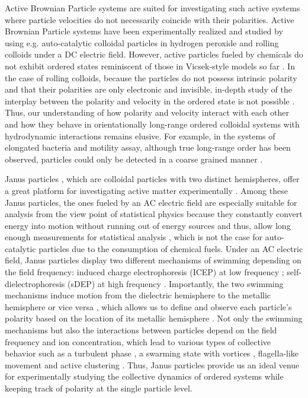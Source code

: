 \documentclass[%
 reprint,
 amsmath,amssymb,
 aps,
 floatfix
]{revtex4-2}
\begin{document}
Active Brownian Particle systems are suited for investigating such active systems where particle velocities do not necessarily coincide with their polarities.
Active Brownian Particle systems have been experimentally realized and studied by using e.g. auto-catalytic colloidal particles in hydrogen peroxide and rolling colloids under a DC electric field. 
However, active particles fueled by chemicals do not exhibit ordered states reminiscent of those in Vicsek-style models so far \cite{theurkauff2012,palacci2013,ginot2018}. 
In the case of rolling colloids, because the particles do not possess intrinsic polarity and that their polarities are only electronic and invisible, in-depth study of the interplay between the polarity and velocity in the ordered state is not possible \cite{bartolo2018}.
Thus, our understanding of how polarity and velocity interact with each other and how they behave in orientationally long-range ordered colloidal systems with hydrodynamic interactions remains elusive.
For example, in the systems of elongated bacteria and motility assay, although true long-range order has been observed, particles could only be detected in a coarse grained manner \cite{nishiguchi2017,tanida2020}.

Janus particles \cite{deGennes1992}, which are colloidal particles with two distinct hemispheres, offer a great platform for investigating active matter experimentally \cite{jiang2010,theurkauff2012, nishiguchi2015, granick2016,mano2017,nishiguchi2018a,linden2019,poncet2020}.
Among these Janus particles, the ones fueled by an AC electric field are especially suitable for analysis from the view point of statistical physics because they constantly convert energy into motion without running out of energy sources and thus, allow long enough measurements for statistical analysis \cite{suzuki2011,nishiguchi2015,mano2017,nishiguchi2018a,linden2019,poncet2020}, which is not the case for auto-catalytic particles due to the consumption of chemical fuels.
Under an AC electric field, Janus particles display two different mechanisms of swimming depending on the field frequency: induced charge electrophoresis (ICEP) at low frequency \cite{squires2004,squires2006,gangwal2008}; self-dielectrophoresis (sDEP) at high frequency \cite{boymelgreen2012,boymelgreen2016}.
Importantly, the two swimming mechanisms induce motion from the dielectric hemisphere to the metallic hemisphere \cite{gangwal2008,suzuki2011,nishiguchi2015,granick2016,nishiguchi2018a,linden2019,poncet2020} or vice versa \cite{suzuki2011,boymelgreen2016,granick2016,nishiguchi2018a}, which allows us to define and observe each particle's polarity based on the location of its metallic hemisphere \cite{nishiguchi2018a,linden2019}.
Not only the swimming mechanisms but also the interactions between particles depend on the field frequency and ion concentration, which lead to various types of collective behavior such as a turbulent phase \cite{nishiguchi2015}, a swarming state with vortices \cite{granick2016}, flagella-like movement \cite{nishiguchi2018a} and active clustering \cite{linden2019}.
Thus, Janus particles provide us an ideal venue for experimentally studying the collective dynamics of ordered systems while keeping track of polarity at the single particle level.
\end{document}
